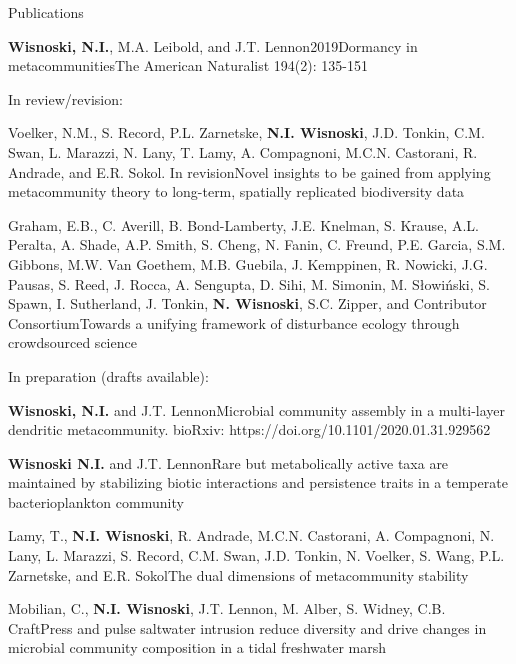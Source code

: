 \documentclass{resume} %
\begin{document}
\begin{rhangSection}{Publications}
\begin{Publication}{{\bf Wisnoski, N.I.}, M.A. Leibold, and J.T. Lennon}{2019}{Dormancy in metacommunities}{The American Naturalist 194(2): 135-151}
\end{Publication}

\bigskip
{ In review/revision:}

\begin{Prep}{Voelker, N.M., S. Record, P.L. Zarnetske, {\bf N.I. Wisnoski}, J.D. Tonkin, C.M. Swan, L. Marazzi, N. Lany, T. Lamy, A. Compagnoni, M.C.N. Castorani, R. Andrade, and E.R. Sokol. In revision}{Novel insights to be gained from applying metacommunity theory to long-term, spatially replicated biodiversity data}
\end{Prep}

\begin{Prep}{Graham, E.B., C. Averill, B. Bond-Lamberty, J.E. Knelman, S. Krause, A.L. Peralta, A. Shade, A.P. Smith, S. Cheng, N. Fanin, C. Freund, P.E. Garcia, S.M. Gibbons, M.W. Van Goethem, M.B. Guebila, J. Kemppinen, R. Nowicki, J.G. Pausas, S. Reed, J. Rocca, A. Sengupta, D. Sihi, M. Simonin, M. Słowiński, S. Spawn, I. Sutherland, J. Tonkin, {\bf N. Wisnoski}, S.C. Zipper, and Contributor Consortium}{Towards a unifying framework of disturbance ecology through crowdsourced science}
\end{Prep}

\bigskip
{ In preparation (drafts available):}

\begin{Prep}{{\bf Wisnoski, N.I.} and J.T. Lennon}{Microbial community assembly in a multi-layer dendritic metacommunity. bioRxiv: https://doi.org/10.1101/2020.01.31.929562}
\end{Prep}

\begin{Prep}{{\bf Wisnoski N.I.} and J.T. Lennon}{Rare but metabolically active taxa are maintained by stabilizing biotic interactions and persistence traits in a temperate bacterioplankton community}
\end{Prep}

\begin{Prep}{Lamy, T., {\bf N.I. Wisnoski}, R. Andrade, M.C.N. Castorani, A. Compagnoni, N. Lany, L. Marazzi, S. Record, C.M. Swan, J.D. Tonkin, N. Voelker, S. Wang, P.L. Zarnetske, and E.R. Sokol}{The dual dimensions of metacommunity stability}
\end{Prep}

\begin{Prep}{Mobilian, C., {\bf N.I. Wisnoski}, J.T. Lennon, M. Alber, S. Widney, C.B. Craft}{Press and pulse saltwater intrusion reduce diversity and drive changes in microbial community composition in a tidal freshwater marsh}
\end{Prep}


\end{rhangSection}
\end{document}

